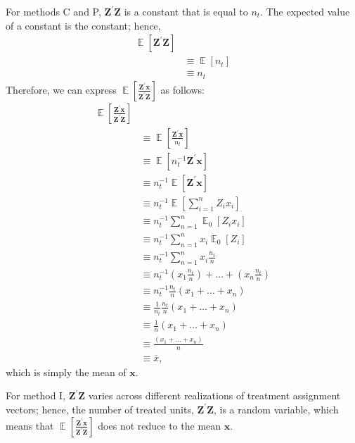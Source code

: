\documentclass[11pt]{article}\usepackage[]{graphicx}\usepackage[]{color}
\theoremstyle{newstyle}
\DeclareMathOperator{\E}{\mathbb{E}}
\begin{document}
For methods C and P, $\mathbf{Z}^{\prime}\mathbf{Z}$ is a constant that is equal to $n_t$. The expected value of a constant is the constant; hence,
\begin{align*}
\E\left[\mathbf{Z}^{\prime}\mathbf{Z}\right] \\
& \equiv \E\left[n_t\right] \\
& \equiv n_t
\end{align*}
Therefore, we can express $\E\left[\frac{\mathbf{Z}^{\prime}\mathbf{x}}{\mathbf{Z}^{\prime}\mathbf{Z}}\right]$ as follows:
\begin{align*}
\E\left[\frac{\mathbf{Z}^{\prime}\mathbf{x}}{\mathbf{Z}^{\prime}\mathbf{Z}}\right] \\
& \equiv \E\left[\frac{\mathbf{Z}^{\prime}\mathbf{x}}{n_t}\right] \\
& \equiv \E\left[n_t^{-1}\mathbf{Z}^{\prime}\mathbf{x}\right] \\
& \equiv n_t^{-1} \E\left[\mathbf{Z}^{\prime}\mathbf{x}\right] \\
& \equiv n_t^{-1} \E\left[\sum \limits_{i = 1}^n Z_i x_i\right] \\
& \equiv n_t^{-1} \sum \limits_{n = 1}^n \E_0\left[Z_i x_i\right]  \\
& \equiv n_t^{-1} \sum \limits_{n = 1}^n x_i \E_0\left[Z_i\right]  \\
& \equiv n_t^{-1} \sum \limits_{n = 1}^n x_i \frac{n_t}{n} \\
& \equiv n_t^{-1}  \left(x_{1} \frac{n_t}{n}\right) + \dots + \left(x_n \frac{n_t}{n}\right)  \\
& \equiv n_t^{-1} \frac{n_t}{n} \left(x_1 + \dots + x_n\right) \\
& \equiv \frac{1}{n_t} \frac{n_t}{n} \left(x_1 + \dots + x_n\right)  \\
& \equiv \frac{1}{n} \left(x_1 + \dots + x_n\right)  \\
& \equiv \frac{\left(x_1 + \dots + x_n\right)}{n} \\
& \equiv \overline{x},
\end{align*}
which is simply the mean of $\mathbf{x}$.

For method I, $\mathbf{Z}^{\prime}\mathbf{Z}$ varies across different realizations of treatment assignment vectors; hence, the number of treated units, $\mathbf{Z}^{\prime}\mathbf{Z}$, is a random variable, which means that $\E\left[\frac{\mathbf{Z}^{\prime}\mathbf{x}}{\mathbf{Z}^{\prime}\mathbf{Z}}\right]$ does not reduce to the mean $\mathbf{x}$.


\newpage

\begin{singlespace}

\end{singlespace}
\end{document}
